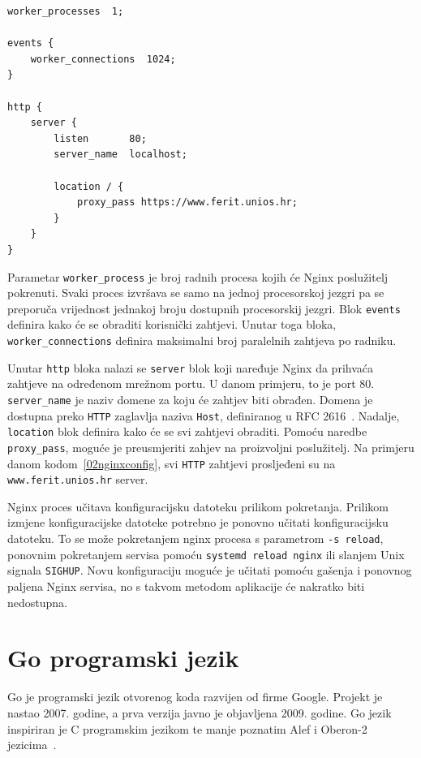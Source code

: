 \begin{lstlisting}[float=h]
worker_processes  1;

events {
    worker_connections  1024;
}

http {
    server {
        listen       80;
        server_name  localhost;

        location / {
            proxy_pass https://www.ferit.unios.hr;
        }
    }
}
\end{lstlisting}

Parametar \texttt{worker\_process} je broj radnih procesa kojih će Nginx poslužitelj pokrenuti.
Svaki proces izvršava se samo na jednoj procesorskoj jezgri pa se preporuča vrijednost jednakoj
broju dostupnih procesorskij jezgri. Blok \texttt{events} definira kako će se obraditi korisnički
zahtjevi.  Unutar toga bloka, \texttt{worker\_connections} definira maksimalni broj paralelnih
zahtjeva po radniku.

Unutar \texttt{http} bloka nalazi se \texttt{server} blok koji naređuje Nginx da prihvaća zahtjeve
na određenom mrežnom portu. U danom primjeru, to je port 80. \texttt{server\_name} je naziv domene
za koju će zahtjev biti obrađen. Domena je dostupna preko \texttt{HTTP} zaglavlja naziva
\texttt{Host}, definiranog u RFC 2616~\citep{fielding1999hypertext}. Nadalje, \texttt{location} blok
definira kako će se svi zahtjevi obraditi. Pomoću naredbe \texttt{proxy\_pass}, moguće je
preusmjeriti zahjev na proizvoljni poslužitelj. Na primjeru danom kodom~\ref{02nginxconfig}, svi
\texttt{HTTP} zahtjevi prosljeđeni su na \texttt{www.ferit.unios.hr} server.

Nginx proces učitava konfiguracijsku datoteku prilikom pokretanja. Prilikom izmjene konfiguracijske
datoteke potrebno je ponovno učitati konfiguracijsku datoteku. To se može pokretanjem nginx procesa
s parametrom \texttt{-s reload}, ponovnim pokretanjem servisa pomoću \texttt{systemd reload nginx}
ili slanjem Unix signala \texttt{SIGHUP}. Novu konfiguraciju moguće je učitati pomoću gašenja i
ponovnog paljena Nginx servisa, no s takvom metodom aplikacije će nakratko biti nedostupna.

\section{Go programski jezik}
Go je programski jezik otvorenog koda razvijen od firme Google. Projekt je nastao 2007. godine, a
prva verzija javno je objavljena 2009. godine. Go jezik inspiriran je C programskim jezikom te manje
poznatim Alef i Oberon-2 jezicima~\citep{donovan2015go}.

